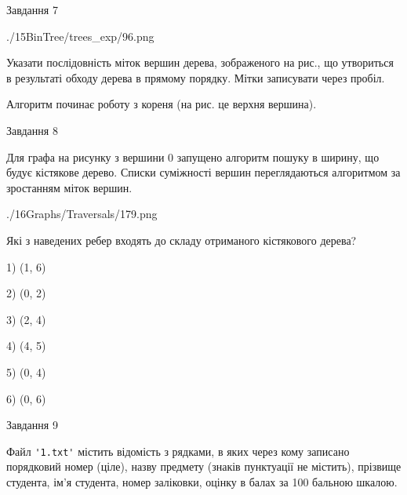 \documentclass[12pt, ukrainian]{article}
\def\code#1{\Verb!#1!}
\begin{document}
{\vspace{10mm}\par

\newpage
\begin{minipage}[t]{9.7cm}
               
{\begin{center}Завдання {7}\end{center}}
\vspace{-6mm}

\begin{center}
	{./15BinTree/trees_exp/96.png}
\end{center}
Указати послідовність міток вершин дерева, зображеного на рис., що утвориться в результаті обходу дерева в прямому порядку. Мітки записувати через пробіл.\par Алгоритм починає роботу з кореня (на рис. це верхня вершина).\par

\end{minipage}
\vline \hspace{8mm}
\begin{minipage}[t]{8.0cm}
               
{\begin{center}Завдання {8}\end{center}}
\vspace{-6mm}
Для графа на рисунку з вершини 0 запущено алгоритм пошуку в ширину, що будує кістякове дерево. Списки суміжності вершин переглядаються алгоритмом за зростанням міток вершин.\par
\begin{center}
	{./16Graphs/Traversals/179.png}
\end{center}
\par Які з наведених ребер входять до складу отриманого кістякового дерева?\par
1) (1, 6)\par
2) (0, 2)\par
3) (2, 4)\par
4) (4, 5)\par
5) (0, 4)\par
6) (0, 6)\par
{\vskip 15pt} \par

\end{minipage}

               
{\begin{center}Завдання {9}\end{center}}
\vspace{-6mm}
Файл \code{'1.txt'} містить відомість з рядками, в яких через кому записано поряд\-ковий номер (ціле), назву предмету (знаків пунктуації не містить), прізвище студента, ім'я студента, номер заліковки, оцінку в балах за 100 бальною шкалою.

}
\end{document}
